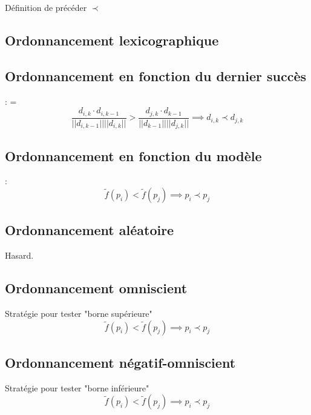 Définition de précéder $\prec$

\subsection{Ordonnancement lexicographique}


\subsection{Ordonnancement en fonction du dernier succès} : =
\begin{equation}
\frac{d_{i,k}\cdot d_{i,k-1}}{||d_{i,k-1}||||{d_{i,k}||}} > \frac{d_{j,k}\cdot d_{k-1}}{||d_{k-1}||||{d_{j,k}||}}  \implies d_{i,k} \prec d_{j,k}  
\end{equation}


\subsection{Ordonnancement en fonction du modèle} : 
\begin{equation}
\tilde{f}(p_i) < \tilde{f}(p_j) \implies p_i \prec p_j
\end{equation}


\subsection{Ordonnancement aléatoire}
Hasard.\\

\subsection{Ordonnancement omniscient}
Stratégie pour tester "borne supérieure"
\begin{equation}
\tilde{f}(p_i) < \tilde{f}(p_j) \implies p_i \prec p_j
\end{equation}

\subsection{Ordonnancement négatif-omniscient}
Stratégie pour tester "borne inférieure"
\begin{equation}
\tilde{f}(p_i) < \tilde{f}(p_j) \implies p_i \prec p_j
\end{equation}

